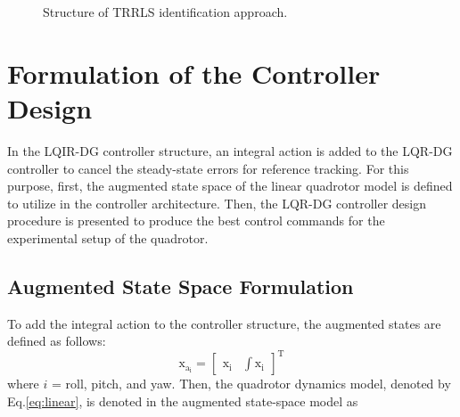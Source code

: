 \documentclass[3p,times]{elsarticle}
\begin{document}
\begin{figure}[H]
		\caption{Structure of TRRLS identification approach.}
		\label{fig:identification}
\end{figure}

\section{Formulation of the Controller Design}\label{sec:controller}
\noindent In the LQIR-DG controller structure, an integral action is added to the LQR-DG controller to cancel the steady-state errors for reference tracking. For this purpose, first, the augmented state space of the linear quadrotor model is defined to utilize in the controller architecture. Then, the LQR-DG controller design procedure is presented to produce the best control commands for the experimental setup of the quadrotor.

\subsection{Augmented State Space Formulation}
\noindent To add the integral action to the controller structure, the augmented states are defined as follows:
\begin{equation}\label{lqidg_x}
    \boldsymbol{\mathrm{x_{a_i}}} = \begin{bmatrix}
        \boldsymbol{\mathrm{x_i}} &
        \displaystyle \int \boldsymbol{\mathrm{x_i}}
    \end{bmatrix}^\mathrm{T}
\end{equation}
where $i$ = roll, pitch, and yaw.
Then, the quadrotor dynamics model, denoted by Eq.\eqref{eq:linear}, is denoted in the augmented state-space model as
\end{document}
